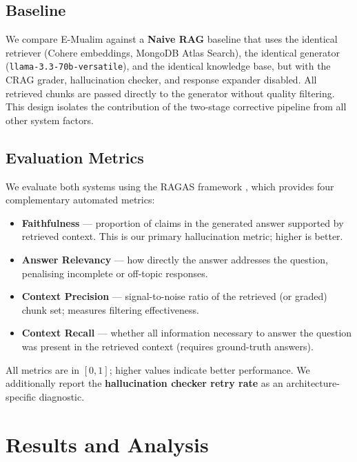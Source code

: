 \documentclass[conference]{IEEEtran}
\begin{document}
\subsection{Baseline}

We compare E-Mualim against a \textbf{Naive RAG} baseline that uses
the identical retriever (Cohere embeddings, MongoDB Atlas Search),
the identical generator (\texttt{llama-3.3-70b-versatile}), and the
identical knowledge base, but with the CRAG grader, hallucination
checker, and response expander disabled.
All retrieved chunks are passed directly to the generator without
quality filtering.
This design isolates the contribution of the two-stage corrective
pipeline from all other system factors.

\subsection{Evaluation Metrics}

We evaluate both systems using the RAGAS framework \cite{es2024ragas},
which provides four complementary automated metrics:

\begin{itemize}
  \item \textbf{Faithfulness} --- proportion of claims in the
        generated answer supported by retrieved context.
        This is our primary hallucination metric; higher is better.
  \item \textbf{Answer Relevancy} --- how directly the answer
        addresses the question, penalising incomplete or off-topic
        responses.
  \item \textbf{Context Precision} --- signal-to-noise ratio of the
        retrieved (or graded) chunk set; measures filtering
        effectiveness.
  \item \textbf{Context Recall} --- whether all information necessary
        to answer the question was present in the retrieved context
        (requires ground-truth answers).
\end{itemize}

All metrics are in $[0, 1]$; higher values indicate better
performance.
We additionally report the \textbf{hallucination checker retry rate}
as an architecture-specific diagnostic.

\section{Results and Analysis}
\label{sec:results}
\end{document}
